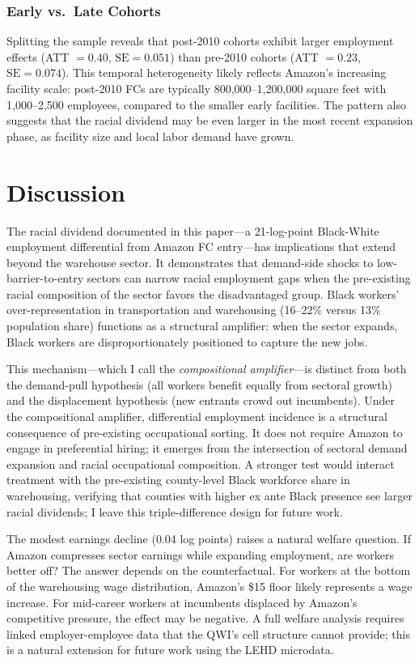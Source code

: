 \documentclass[12pt]{article}
\begin{document}
\subsubsection*{Early vs.\ Late Cohorts} Splitting the sample reveals that post-2010 cohorts exhibit larger employment effects (ATT $= 0.40$, $\text{SE} = 0.051$) than pre-2010 cohorts (ATT $= 0.23$, $\text{SE} = 0.074$). This temporal heterogeneity likely reflects Amazon's increasing facility scale: post-2010 FCs are typically 800,000--1,200,000 square feet with 1,000--2,500 employees, compared to the smaller early facilities. The pattern also suggests that the racial dividend may be even larger in the most recent expansion phase, as facility size and local labor demand have grown.


\section{Discussion}

The racial dividend documented in this paper---a 21-log-point Black-White employment differential from Amazon FC entry---has implications that extend beyond the warehouse sector. It demonstrates that demand-side shocks to low-barrier-to-entry sectors can narrow racial employment gaps when the pre-existing racial composition of the sector favors the disadvantaged group. Black workers' over-representation in transportation and warehousing (16--22\% versus 13\% population share) functions as a structural amplifier: when the sector expands, Black workers are disproportionately positioned to capture the new jobs.

This mechanism---which I call the \textit{compositional amplifier}---is distinct from both the demand-pull hypothesis (all workers benefit equally from sectoral growth) and the displacement hypothesis (new entrants crowd out incumbents). Under the compositional amplifier, differential employment incidence is a structural consequence of pre-existing occupational sorting. It does not require Amazon to engage in preferential hiring; it emerges from the intersection of sectoral demand expansion and racial occupational composition. A stronger test would interact treatment with the pre-existing county-level Black workforce share in warehousing, verifying that counties with higher ex ante Black presence see larger racial dividends; I leave this triple-difference design for future work.

The modest earnings decline (0.04 log points) raises a natural welfare question. If Amazon compresses sector earnings while expanding employment, are workers better off? The answer depends on the counterfactual. For workers at the bottom of the warehousing wage distribution, Amazon's \$15 floor likely represents a wage increase. For mid-career workers at incumbents displaced by Amazon's competitive pressure, the effect may be negative. A full welfare analysis requires linked employer-employee data that the QWI's cell structure cannot provide; this is a natural extension for future work using the LEHD microdata.
\end{document}
